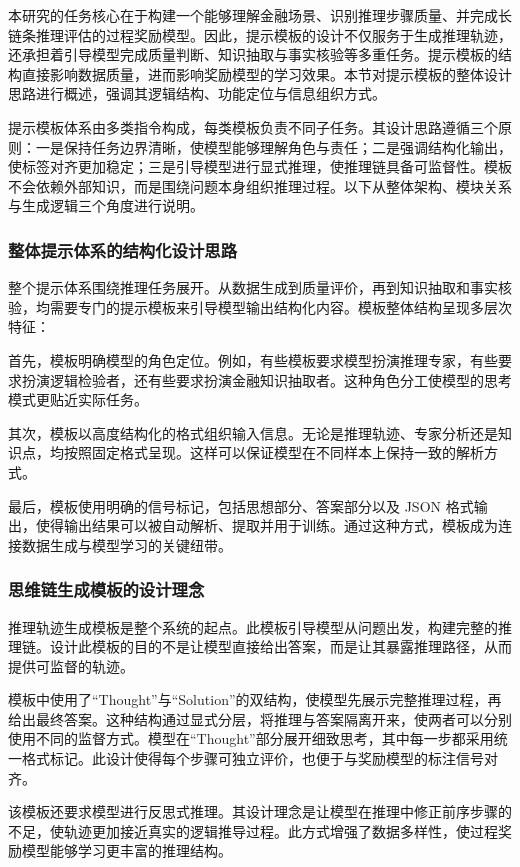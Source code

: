 \documentclass[professional,privacy,print,win,long,STEM,AutoFakeBold]{def/buaa}
\begin{document}
本研究的任务核心在于构建一个能够理解金融场景、识别推理步骤质量、并完成长链条推理评估的过程奖励模型。因此，提示模板的设计不仅服务于生成推理轨迹，还承担着引导模型完成质量判断、知识抽取与事实核验等多重任务。提示模板的结构直接影响数据质量，进而影响奖励模型的学习效果。本节对提示模板的整体设计思路进行概述，强调其逻辑结构、功能定位与信息组织方式。

提示模板体系由多类指令构成，每类模板负责不同子任务。其设计思路遵循三个原则：一是保持任务边界清晰，使模型能够理解角色与责任；二是强调结构化输出，使标签对齐更加稳定；三是引导模型进行显式推理，使推理链具备可监督性。模板不会依赖外部知识，而是围绕问题本身组织推理过程。以下从整体架构、模块关系与生成逻辑三个角度进行说明。

\subsubsection{整体提示体系的结构化设计思路}

整个提示体系围绕推理任务展开。从数据生成到质量评价，再到知识抽取和事实核验，均需要专门的提示模板来引导模型输出结构化内容。模板整体结构呈现多层次特征：

首先，模板明确模型的角色定位。例如，有些模板要求模型扮演推理专家，有些要求扮演逻辑检验者，还有些要求扮演金融知识抽取者。这种角色分工使模型的思考模式更贴近实际任务。

其次，模板以高度结构化的格式组织输入信息。无论是推理轨迹、专家分析还是知识点，均按照固定格式呈现。这样可以保证模型在不同样本上保持一致的解析方式。

最后，模板使用明确的信号标记，包括思想部分、答案部分以及 JSON 格式输出，使得输出结果可以被自动解析、提取并用于训练。通过这种方式，模板成为连接数据生成与模型学习的关键纽带。

\subsubsection{思维链生成模板的设计理念}

推理轨迹生成模板是整个系统的起点。此模板引导模型从问题出发，构建完整的推理链。设计此模板的目的不是让模型直接给出答案，而是让其暴露推理路径，从而提供可监督的轨迹。

模板中使用了“Thought”与“Solution”的双结构，使模型先展示完整推理过程，再给出最终答案。这种结构通过显式分层，将推理与答案隔离开来，使两者可以分别使用不同的监督方式。模型在“Thought”部分展开细致思考，其中每一步都采用统一格式标记。此设计使得每个步骤可独立评价，也便于与奖励模型的标注信号对齐。

该模板还要求模型进行反思式推理。其设计理念是让模型在推理中修正前序步骤的不足，使轨迹更加接近真实的逻辑推导过程。此方式增强了数据多样性，使过程奖励模型能够学习更丰富的推理结构。
\end{document}
